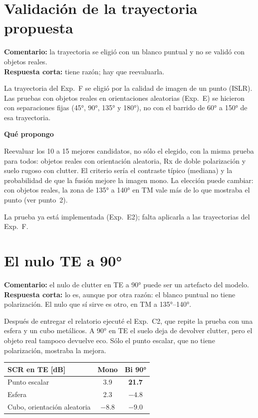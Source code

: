 \documentclass[11pt,a4paper]{article}
\newcommand{\encorto}[2]{\par\noindent\colorbox{acento!7}{\parbox{\dimexpr\linewidth-2\fboxsep}{%
\small\textbf{Comentario:} #1\\[1pt]\textbf{Respuesta corta:} #2}}\par\smallskip}
\newcommand{\paso}[1]{\par\smallskip\needspace{5\baselineskip}\noindent\textbf{\color{acento}#1}\par}
\begin{document}
\section{Validación de la trayectoria propuesta}

\encorto{la trayectoria se eligió con un blanco puntual y no se validó con objetos reales.}
{tiene razón; hay que reevaluarla.}

La trayectoria del Exp.~F se eligió por la calidad de imagen de un punto (ISLR). Las
pruebas con objetos reales en orientaciones aleatorias (Exp.~E) se hicieron con
separaciones fijas (45°, 90°, 135° y 180°), no con el barrido de 60° a 150° de esa
trayectoria.

\paso{Qué propongo}
Reevaluar los 10 a 15 mejores candidatos, no sólo el elegido, con la misma prueba para
todos: objetos reales con orientación aleatoria, Rx de doble polarización y suelo rugoso
con clutter. El criterio sería el contraste típico (mediana) y la probabilidad de que la
fusión mejore la imagen mono. La elección puede cambiar: con objetos reales, la zona de
135° a 140° en TM vale más de lo que mostraba el punto (ver punto~2).

La prueba ya está implementada (Exp.~E2); falta aplicarla a las trayectorias del Exp.~F.

\section{El nulo TE a 90°}

\encorto{el nulo de clutter en TE a 90° puede ser un artefacto del modelo.}
{lo es, aunque por otra razón: el blanco puntual no tiene polarización. El nulo que sí
sirve es otro, en TM a 135°--140°.}

Después de entregar el relatorio ejecuté el Exp.~C2, que repite la prueba con una esfera y
un cubo metálicos. A 90° en TE el suelo deja de devolver clutter, pero el objeto real
tampoco devuelve eco. Sólo el punto escalar, que no tiene polarización, mostraba la mejora.

\begin{center}
\begin{tabular}{@{}lcc@{}}
\toprule
SCR en TE [dB] & Mono & Bi 90° \\
\midrule
Punto escalar & 3.9 & \textbf{21.7} \\
Esfera & 2.3 & $-4.8$ \\
Cubo, orientación aleatoria & $-8.8$ & $-9.0$ \\
\bottomrule
\end{tabular}
\end{center}
\end{document}
